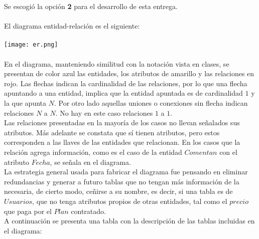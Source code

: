 \documentclass[letter]{article}
\begin{document}
	\begin{pregunta}{1} %
		Se escogió la opción \textbf{2} para el desarrollo de esta entrega.\\ \\
		El diagrama entidad-relación es el siguiente:\\ \\
		\texttt{[image: er.png]}\\ \\
		En el diagrama, manteniendo similitud con la notación vista en clases, se presentan de color azul las entidades, los atributos de amarillo y las relaciones en rojo. Las flechas indican la cardinalidad de las relaciones, por lo que una flecha apuntando a una entidad, implica que la entidad apuntada es de cardinalidad $1$ y la que apunta $N$. Por otro lado aquellas uniones o conexiones sin flecha indican relaciones $N$ a $N$. No hay en este caso relaciones $1$ a $1$.\\

		Las relaciones presentadas en la mayoría de los casos no llevan señalados sus atributos. Más adelante se constata que sí tienen atributos, pero estos corresponden a las llaves de las entidades que relacionan. En los casos que la relación agrega información, como es el caso de la entidad $Comentan$ con el atributo $Fecha$, se señala en el diagrama.\\

		La estrategia general usada para fabricar el diagrama fue pensando en eliminar redundancias y generar a futuro tablas que no tengan más información de la necesaria, de cierto modo, ceñirse a su nombre, es decir, si una tabla es de $Usuarios$, que no tenga atributos propios de otras entidades, tal como el $precio$ que paga por el $Plan$ contratado.\\

		A continuación se presenta una tabla con la descripción de las tablas incluidas en el diagrama:\\


\end{pregunta}
\end{document}

